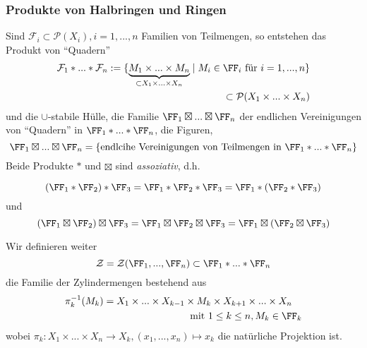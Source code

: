 \subsubsection{Produkte von Halbringen und Ringen}
Sind $\mathcal{F}_i \subset \mathcal{P}(X_i), i=1,...,n$ Familien von Teilmengen, so entstehen das Produkt von ``Quadern''
\begin{equation*}
\begin{split}
\mathcal{F}_1 \ast ... \ast \mathcal{F}_n := \{ \underbrace{M_1 \times ... \times M_n}_{\subset X_1 \times ... \times X_n} \mid M_i \in \FF_i \text{ für } i=1,...,n\}  \\ \subset  \mathcal{P}(X_1 \times ... \times X_n)
\end{split}
\end{equation*}
und die $\cup$-stabile Hülle, die Familie $\FF_1 \boxtimes ... \boxtimes \FF_n$ der endlichen Vereinigungen von ``Quadern'' in $\FF_1 \ast ... \ast \FF_n$, die Figuren, 
\begin{equation*}
\FF_1 \boxtimes ... \boxtimes \FF_n = \left\{\text{endlcihe Vereinigungen von Teilmengen in } \FF_1 \ast ... \ast \FF_n	\right\}
\end{equation*}
Beide Produkte $\ast$ und $\boxtimes$ sind \emph{assoziativ}, d.h.\begin{small}
\begin{equation*}
(\FF_1 \ast \FF_2) \ast \FF_3 = \FF_1 \ast \FF_2 \ast \FF_3 = \FF_1 \ast (\FF_2 \ast \FF_3)
\end{equation*}
und
\begin{equation*}
(\FF_1 \boxtimes \FF_2) \boxtimes \FF_3 = \FF_1 \boxtimes \FF_2 \boxtimes \FF_3 = \FF_1 \boxtimes (\FF_2 \boxtimes \FF_3)
\end{equation*}
\end{small}
Wir definieren weiter
\begin{equation*}
\mathcal{Z} = \mathcal{Z} (\FF_1,...,\FF_n) \subset \FF_1 \ast ... \ast \FF_n
\end{equation*}
die Familie der Zylindermengen bestehend aus
\begin{equation*}
\begin{split}
\pi_k^{-1}(M_k) = X_1 \times ... \times X_{k-1} \times M_k \times X_{k+1} \times ... \times X_n \quad\\ \text{mit } 1 \leq k \leq n, M_k \in \FF_k
\end{split}
\end{equation*}
wobei $\pi_k: X_1 \times ... \times X_n \to X_k, (x_1,...,x_n) \mapsto x_k$ die natürliche Projektion ist. %

